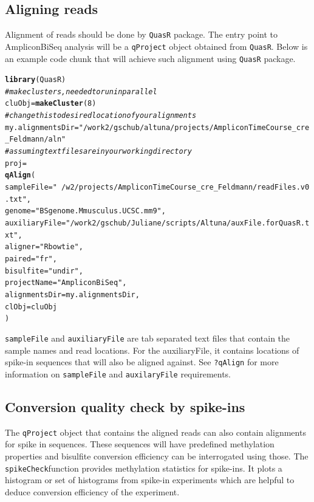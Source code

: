 \documentclass{article}\usepackage[]{graphicx}\usepackage[]{color}
\makeatletter
\newcommand{\hlnum}[1]{\textcolor[rgb]{0.686,0.059,0.569}{#1}}%
\newcommand{\hlstr}[1]{\textcolor[rgb]{0.192,0.494,0.8}{#1}}%
\newcommand{\hlcom}[1]{\textcolor[rgb]{0.678,0.584,0.686}{\textit{#1}}}%
\newcommand{\hlstd}[1]{\textcolor[rgb]{0.345,0.345,0.345}{#1}}%
\newcommand{\hlkwb}[1]{\textcolor[rgb]{0.69,0.353,0.396}{#1}}%
\newcommand{\hlkwc}[1]{\textcolor[rgb]{0.333,0.667,0.333}{#1}}%
\newcommand{\hlkwd}[1]{\textcolor[rgb]{0.737,0.353,0.396}{\textbf{#1}}}%
\newenvironment{kframe}{%
 \def\at@end@of@kframe{}%
 \ifinner\ifhmode%
  \def\at@end@of@kframe{\end{minipage}}%
  \begin{minipage}{\columnwidth}%
 \fi\fi%
 \def\FrameCommand##1{\hskip\@totalleftmargin \hskip-\fboxsep
 \colorbox{shadecolor}{##1}\hskip-\fboxsep
     \hskip-\linewidth \hskip-\@totalleftmargin \hskip\columnwidth}%
 \MakeFramed {\advance\hsize-\width
   \@totalleftmargin\z@ \linewidth\hsize
   \@setminipage}}%
 {\par\unskip\endMakeFramed%
 \at@end@of@kframe}
\newenvironment{knitrout}{}{} %
\makeatother
\begin{document}
\subsection{Aligning reads}
Alignment of reads should be done by \texttt{QuasR} package. The entry point to AmpliconBiSeq
analysis will be a \texttt{qProject} object obtained from \texttt{QuasR}. Below is an example code chunk
that will achieve such alignment using \texttt{QuasR} package.
\begin{knitrout}
\color{fgcolor}\begin{kframe}
\begin{alltt}
\hlkwd{library}\hlstd{(QuasR)}
\hlcom{# make clusters, needed to run in parallel}
\hlstd{cluObj}\hlkwb{=}\hlkwd{makeCluster}\hlstd{(}\hlnum{8}\hlstd{)}
\hlcom{#change this to desired location of your alignments }
\hlstd{my.alignmentsDir}\hlkwb{=}\hlstr{"/work2/gschub/altuna/projects/AmpliconTimeCourse_cre_Feldmann/aln"}
\hlcom{#assuming text files are in your working directory}
\hlstd{proj}\hlkwb{=}
  \hlkwd{qAlign}\hlstd{(}
  \hlkwc{sampleFile}\hlstd{=}\hlstr{"~/w2/projects/AmpliconTimeCourse_cre_Feldmann/readFiles.v0.txt"}\hlstd{,}
  \hlkwc{genome}\hlstd{=}\hlstr{"BSgenome.Mmusculus.UCSC.mm9"}\hlstd{,}
  \hlkwc{auxiliaryFile}\hlstd{=}\hlstr{"/work2/gschub/Juliane/scripts/Altuna/auxFile.forQuasR.txt"}\hlstd{,}
  \hlkwc{aligner}\hlstd{=}\hlstr{"Rbowtie"}\hlstd{,}
  \hlkwc{paired}\hlstd{=}\hlstr{"fr"}\hlstd{,}
  \hlkwc{bisulfite}\hlstd{=}\hlstr{"undir"}\hlstd{,}
  \hlkwc{projectName}\hlstd{=}\hlstr{"AmpliconBiSeq"}\hlstd{,}
  \hlkwc{alignmentsDir}\hlstd{=my.alignmentsDir,}
  \hlkwc{clObj}\hlstd{=cluObj}
  \hlstd{)}
\end{alltt}
\end{kframe}
\end{knitrout}

\texttt{sampleFile} and \texttt{auxiliaryFile} are tab separated text files that
contain the sample names and read locations. For the auxiliaryFile, it contains
locations of spike-in sequences that will also be aligned against. See \texttt{?qAlign}
for more information on \texttt{sampleFile} and \texttt{auxilaryFile} requirements.


\subsection{Conversion quality check by spike-ins}
The \texttt{qProject} object that contains the aligned reads can also contain alignments for spike in sequences.
These sequences will have predefined methylation properties and bisulfite conversion efficiency can be interrogated
using those. The \texttt{spikeCheck}function provides methylation statistics for spike-ins. It plots a 
histogram or set of histograms from spike-in experiments which are helpful
to deduce conversion efficiency of the experiment.
\end{document}
